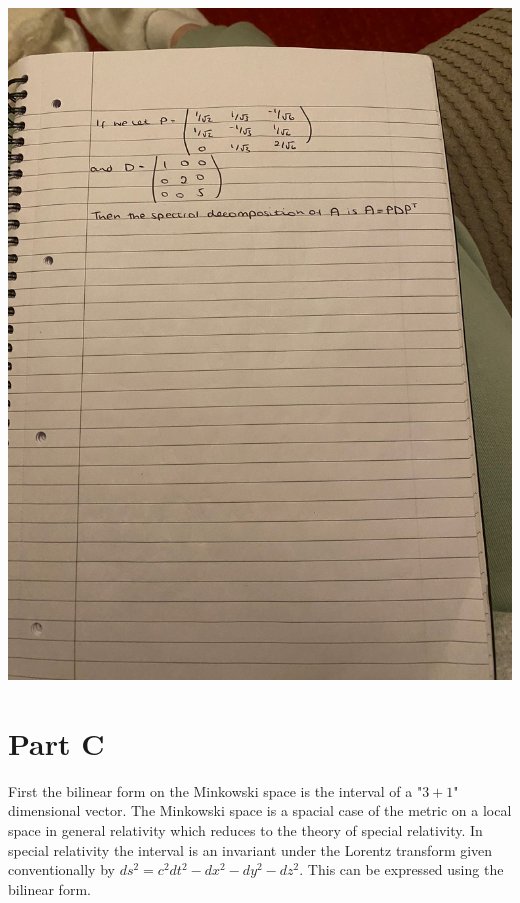 \documentclass{article}
\begin{document}
\includegraphics[scale = 0.25]{WhatsApp Image 2023-11-26 at 17.30.35_a5f8feeb.jpg}

\break
\section{Part C}
First the bilinear form on the Minkowski space is the interval of a "$3+1$" dimensional vector. The Minkowski space is a spacial case of the metric on a local space in general relativity \cite{Gravitation} which reduces to the theory of special relativity. In special relativity\cite{Special} the interval is an invariant under the Lorentz transform given conventionally by $ds^2 = c^2dt^2 - dx^2 - dy^2 - dz^2$. This can be expressed using the bilinear form.

\setlength{\belowdisplayskip}{0pt} \setlength{\belowdisplayshortskip}{0pt}
\setlength{\abovedisplayskip}{0pt} \setlength{\abovedisplayshortskip}{0pt}
\end{document}
